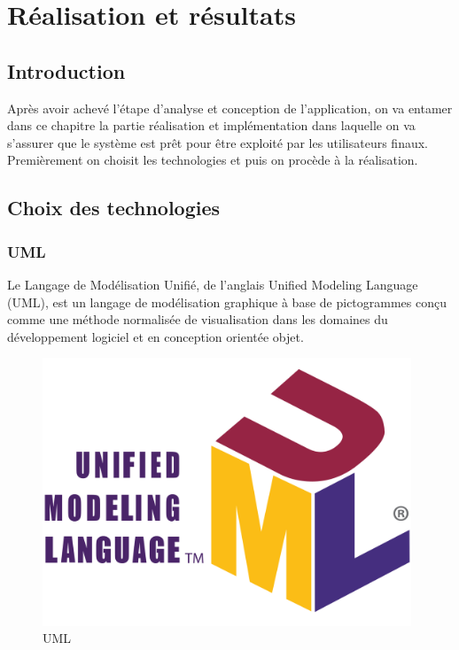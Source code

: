 \chapter{Réalisation et résultats}

\section{Introduction}

Après avoir achevé l’étape d’analyse et conception de l’application, on va entamer dans ce chapitre la partie réalisation et implémentation dans laquelle on va s’assurer que le système est prêt pour être exploité par les utilisateurs finaux. Premièrement on choisit les technologies et puis on procède à la réalisation.


\section{Choix des technologies}

\subsection{UML}

Le Langage de Modélisation Unifié, de l'anglais Unified Modeling Language (UML), est un langage de modélisation graphique à base de pictogrammes conçu comme une méthode normalisée de visualisation dans les domaines du développement logiciel et en conception orientée objet.

\begin{figure}[!h]
\begin{center}
\includegraphics[height=8cm]{UML.svg.png}
\end{center}
\caption{UML}
\end{figure}


